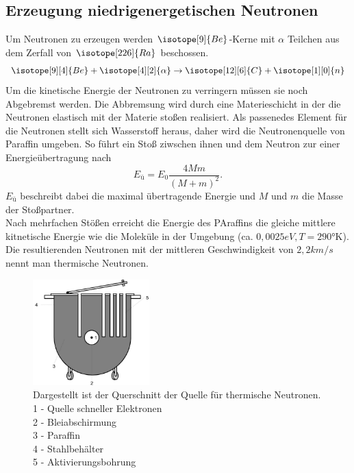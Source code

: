 \subsection{Erzeugung niedrigenergetischen Neutronen}
Um Neutronen zu erzeugen werden $\isotope[9]{Be}$-Kerne mit $\alpha$ Teilchen aus dem Zerfall von $\isotope[226]{Ra}$ beschossen.
\begin{equation}
    \isotope[9][4]{Be} + \isotope[4][2]{\alpha} \to \isotope[12][6]{C} + \isotope[1][0]{n}
\end{equation}
Um die kinetische Energie der Neutronen zu verringern müssen sie noch Abgebremst werden.
Die Abbremsung wird durch eine Materieschicht in der die Neutronen elastisch mit der Materie stoßen realisiert.
Als passenedes Element für die Neutronen stellt sich Wasserstoff heraus, 
daher wird die Neutronenquelle von Paraffin umgeben. So führt ein Stoß ziwschen ihnen und dem Neutron
zur einer Energieübertragung nach
\begin{equation}
    E_ü=E_0\frac{4Mm}{(M+m)^2}.
\end{equation}
$E_ü$ beschreibt dabei die maximal übertragende Energie und $M$ und $m$ die Masse der
Stoßpartner.\\
Nach mehrfachen Stößen erreicht die Energie des PAraffins die gleiche mittlere kitnetische Energie 
wie die Moleküle in der Umgebung (ca. $0,0025\si{eV},T=290\text{°K}$).
Die resultierenden Neutronen mit der mittleren Geschwindigkeit von $2,2\si{km/s}$ nennt
man thermische Neutronen.
\begin{figure}
    \centering
    \includegraphics[width=0.4\textwidth]{bilder/Quelle.jpg}
    \caption{Dargestellt ist der Querschnitt der Quelle für thermische Neutronen.\cite[213]{anleitung}\\
    1 - Quelle schneller Elektronen\\
    2 - Bleiabschirmung\\
    3 - Paraffin\\
    4 - Stahlbehälter\\
    5 - Aktivierungsbohrung}
\end{figure}
